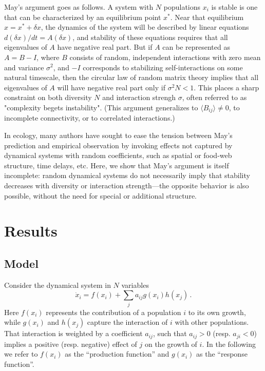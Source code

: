 \documentclass[%
 reprint,
 amsmath,amssymb,
 aps,
]{revtex4-2}
\begin{document}
May's argument goes as follows. A system with $N$ populations $x_i$ is stable is one that can be characterized by an equilibrium point $x^*$. Near that equilibrium $x = x^* + \delta x$, the dynamics of the system will be described by linear equations $d(\delta x)/dt = A (\delta x)$, and stability of these equations requires that all eigenvalues of $A$ have negative real part. But if $A$ can be represented as $A = B - I$, where $B$ consists of random, independent interactions with zero mean and variance $\sigma^2$, and $-I$ corresponds to stabilizing self-interactions on some natural timescale, then the circular law of random matrix theory implies that all eigenvalues of $A$ will have negative real part only if $\sigma^2 N < 1$. This places a sharp constraint on both diversity $N$ and interaction strengh $\sigma$, often referred to as "complexity begets instability". (This argument generalizes to $\langle B_{ij}\rangle \neq 0$, to incomplete connectivity, or to correlated interactions.)

In ecology, many authors have sought to ease the tension between May's prediction and empirical observation by invoking effects not captured by dynamical systems with random coefficients, such as spatial or food-web structure, time delays, etc. 
Here, we show that May's argument is itself incomplete: random dynamical systems do not necessarily imply that stability decreases with diversity or interaction strength---the opposite behavior is also possible, without the need for special or additional structure. 

\section{Results}

\subsection{Model}

Consider the dynamical system in $N$ variables
\begin{equation}\label{dynamics}
    \dot{x}_i = f(x_i) + \sum_{j}a_{ij}g(x_i)h(x_j) \, .
\end{equation}
Here $f(x_i)$ represents the contribution of a population $i$ to its own growth, while $g(x_i)$ and $h(x_j)$ capture the interaction of $i$ with other populations. 
That interaction is weighted by a coefficient $a_{ij}$, such that $a_{ij} > 0$ (resp. $a_{ji} < 0$) implies a positive (resp. negative) effect of $j$ on the growth of $i$. 
In the following we refer to $f(x_i)$ as the ``production function'' and $g(x_i)$ as the ``response function''. 
\end{document}
